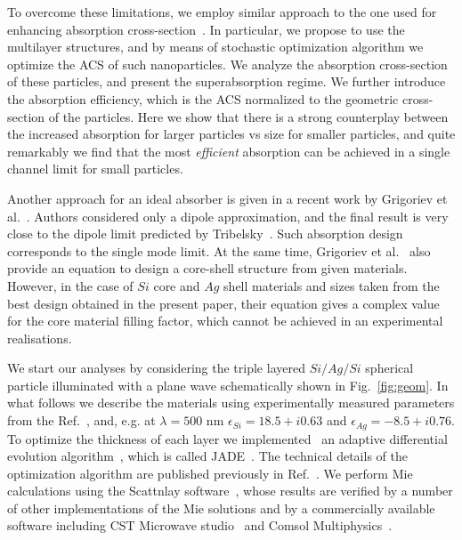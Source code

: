 \documentclass[aps,prl,twocolumn,showpacs,superscriptaddress,groupedaddress]{revtex4-1}
\begin{document}
To overcome these limitations, we employ similar approach to the one
used for enhancing absorption cross-section~\cite{Fan-2011}. In
particular, we propose to use the multilayer structures, and by means
of stochastic optimization algorithm we optimize the ACS of such
nanoparticles. We analyze the absorption cross-section of these
particles, and present the superabsorption regime. We further
introduce the absorption efficiency, which is the ACS normalized to
the geometric cross-section of the particles. Here we show that there
is a strong counterplay between the increased absorption for larger
particles vs size for smaller particles, and quite remarkably we find
that the most {\em efficient} absorption can be achieved in a single
channel limit for small particles.

Another approach for an ideal absorber is given in a recent work by
Grigoriev et al.~\cite{Grigoriev-2015}. Authors considered only a
dipole approximation, and the final result is very close to the dipole
limit predicted by Tribelsky~\cite{Tribelsky-2011}.  Such absorption
design corresponds to the single mode limit.  At the same time,
Grigoriev et al.~\cite{Grigoriev-2015} also provide an equation to
design a core-shell structure from given materials. However, in the
case of $Si$ core and $Ag$ shell materials and sizes taken from the
best design obtained in the present paper, their equation gives a
complex value for the core material filling factor, which cannot be
achieved in an experimental realisations.

\begin{figure}
\end{figure}


We start our analyses by considering the triple layered $Si/Ag/Si$
spherical particle illuminated with a plane wave schematically shown
in Fig.~\ref{fig:geom}. In what follows we describe the materials
using experimentally measured parameters from the
Ref.~\cite{palik-1997}, and, e.g. at $\lambda = 500$ nm $\epsilon_{Si}
= 18.5 + i0.63$ and $\epsilon_{Ag} = -8.5 + i0.76$.  To optimize the
thickness of each layer we implemented~\cite{JADE-web} an adaptive
differential evolution algorithm~\cite{Storn-DE-first-1997}, which is
called JADE~\cite{Jingqiao-JADE-2009}.  The technical details of the
optimization algorithm are published previously in
Ref.~\cite{Ladutenko-2014}. We perform Mie calculations using the
Scattnlay software~\cite{Pena-scattnlay-2009,Scattnlay-web}, whose
results are verified by a number of other implementations of the Mie
solutions and by a commercially available software including CST
Microwave studio~\cite{CST-web} and Comsol
Multiphysics~\cite{Comsol-web}.
\end{document}
